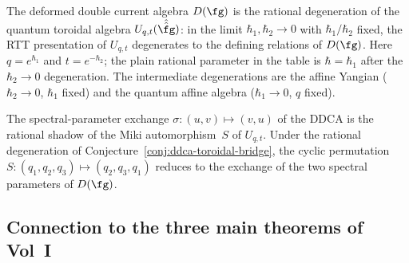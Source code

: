 \begin{conjecture}
\label{conj:ddca-toroidal-bridge}
\ClaimStatusConjectured
The deformed double current algebra $D(\fg)$ is the rational
degeneration of the quantum toroidal algebra
$U_{q,t}(\hat{\hat{\fg}})$: in the limit
$\hbar_1, \hbar_2 \to 0$ with $\hbar_1/\hbar_2$ fixed, the RTT
presentation of $U_{q,t}$ degenerates to the defining relations of
$D(\fg)$. Here $q=e^{\hbar_1}$ and $t=e^{-\hbar_2}$; the plain
rational parameter in the table is $\hbar=\hbar_1$ after the
$\hbar_2 \to 0$ degeneration. The intermediate degenerations are the affine Yangian
($\hbar_2 \to 0$, $\hbar_1$ fixed) and the quantum affine algebra
($\hbar_1 \to 0$, $q$ fixed).
\end{conjecture}

\begin{remark}
\label{rem:ddca-miki-shadow}
The spectral-parameter exchange $\sigma \colon (u,v) \mapsto (v,u)$
of the DDCA is the rational shadow of the Miki automorphism~$S$
of $U_{q,t}$. Under the rational degeneration of
Conjecture~\ref{conj:ddca-toroidal-bridge}, the cyclic permutation
$S \colon (q_1, q_2, q_3) \mapsto (q_2, q_3, q_1)$ reduces to the
exchange of the two spectral parameters of $D(\fg)$.
\end{remark}

\subsection{Connection to the three main theorems of Vol~I}

